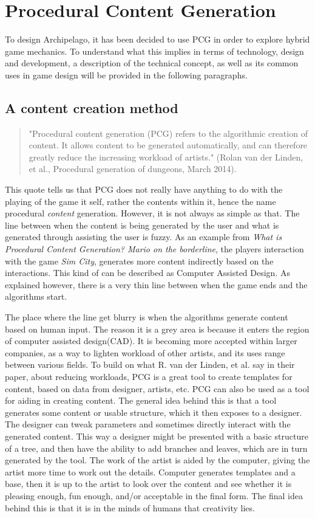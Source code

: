 \section{Procedural Content Generation}
To design Archipelago, it has been decided to use PCG in order to explore hybrid game mechanics. To understand what this implies in terms of technology, design and development, a description of the technical concept, as well as its common uses in game design will be provided in the following paragraphs.
\subsection{A content creation method}
\begin{quotation}
"Procedural content generation (PCG) refers to the algorithmic creation of content. It allows content to be generated automatically, and can therefore greatly reduce the increasing workload of artists." (Rolan van der Linden, et al., Procedural generation of dungeons, March 2014). \cite{art:pcg}
\end{quotation}
This quote tells us that PCG does not really have anything to do with the playing of the game it self, rather the contents within it, hence the name procedural \textit{content} generation. 
However, it is not always as simple as that. The line between when the content is being generated by the user and what is generated through assisting the user is fuzzy.
As an example from \textit{What is Procedural Content Generation? Mario on the borderline}\cite{art:whatpcg}, the players interaction with the game \textit{Sim City}, generates more content indirectly based on the interactions. This kind of can be described as Computer Assisted Design. As explained however, there is a very thin line between when the game ends and the algorithms start. 

The place where the line get blurry is when the algorithms generate content based on human input. The reason it is a grey area is because it enters the region of computer assisted design(CAD)\cite{book:cad}.
It is becoming more accepted within larger companies, as a way to lighten workload of other artists, and its uses range between various fields.
To build on what R. van der Linden, et al. say in their paper, about reducing workloads, PCG is a great tool to create templates for content, based on data from designer, artists, etc. PCG can also be used as a tool for aiding in creating content.  
The general idea behind this is that a tool generates some content or usable structure, which it then exposes to a designer. The designer can tweak parameters and sometimes directly interact with the generated content. This way a designer might be presented with a basic structure of a tree, and then have the ability to add branches and leaves, which are in turn generated by the tool. 
The work of the artist is aided by the computer, giving the artist more time to work out the details. Computer generates templates and a base, then it is up to the artist to look over the content and see whether it is pleasing enough, fun enough, and/or acceptable in the final form. The final idea behind this is that it is in the minds of humans that creativity lies. 

